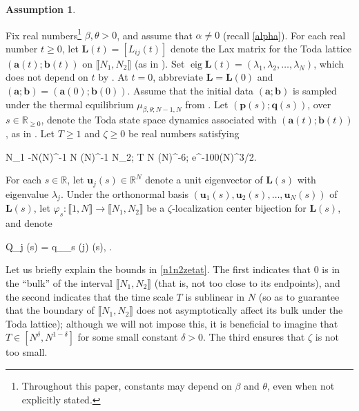 \documentclass{amsart}
\numberwithin{equation}{section}
\DeclareMathOperator{\eig}{eig}
\theoremstyle{remark}
\theoremstyle{definition}
\newtheorem{assumption}[thm]{Assumption}
\begin{document}
		\begin{assumption}
			\label{lbetaeta} 
			
			Fix real numbers\footnote{Throughout this paper, constants may depend on $\beta$ and $\theta$, even when not explicitly stated.} $\beta, \theta > 0$, and assume that $\alpha \ne 0$ (recall \eqref{alpha}). For each real number $t \ge0 $, let $\bm{L}(t) = [L_{ij}(t)]$ denote the Lax matrix for the Toda lattice $(\bm{a}(t);\bm{b}(t))$ on $\llbracket N_1, N_2 \rrbracket$ (as in ). Set $\eig \bm{L}(t) = (\lambda_1, \lambda_2, \ldots , \lambda_N)$, which does not depend on $t$ by . At $t = 0$, abbreviate $\bm{L} = \bm{L}(0)$ and $(\bm{a}; \bm{b}) = ( \bm{a}(0); \bm{b}(0))$. Assume that the initial data $(\bm{a}; \bm{b})$ is sampled under the thermal equilibrium $\mu_{\beta, \theta; N-1,N}$ from . Let $( \bm{p}(s); \bm{q}(s) )$, over $s \in \mathbb{R}_{\ge 0}$, denote the Toda state space dynamics associated with $( \bm{a}(t); \bm{b}(t))$, as in . Let $T \ge 1$ and $\zeta \ge 0$ be real numbers satisfying
			\begin{flalign}
				\label{n1n2zetat} 
				N_1 \le -N(\log N)^{-1} \le N (\log N)^{-1} \le N_2;  \le T \le N (\log N)^{-6}; \qquad  \zeta \ge e^{-100(\log N)^{3/2}}.
			\end{flalign}
			
			\noindent For each $s \in \mathbb{R}$, let $\bm{u}_j (s) \in \mathbb{R}^N$ denote a unit eigenvector of $\bm{L}(s)$ with eigenvalue $\lambda_j$. Under the orthonormal basis $(\bm{u}_1 (s), \bm{u}_2 (s), \ldots , \bm{u}_N (s))$ of $\bm{L}(s)$, let $\varphi_s: \llbracket 1, N \rrbracket \rightarrow \llbracket N_1, N_2 \rrbracket$ be a $\zeta$-localization center bijection for $\bm{L}(s)$, and denote 
			\begin{flalign}
				\label{qjs2}
				Q_j (s) = q_{\varphi_s (j)} (s), \qquad \text{for each $(j, s) \in \llbracket 1, N \rrbracket \times \mathbb{R}_{\ge 0}$}.
			\end{flalign}
			
			
		\end{assumption}
		
		Let us briefly explain the bounds in \eqref{n1n2zetat}. The first indicates that $0$ is in the ``bulk'' of the interval $\llbracket N_1, N_2 \rrbracket$ (that is, not too close to its endpoints), and the second indicates that the time scale $T$ is sublinear in $N$ (so as to guarantee that the boundary of $\llbracket N_1, N_2 \rrbracket$ does not asymptotically affect its bulk under the Toda lattice); although we will not impose this, it is beneficial to imagine that $T \in [N^{\delta}, N^{1-\delta}]$ for some small constant $\delta>0$. The third ensures that $\zeta$ is not too small.
		
\end{document}
